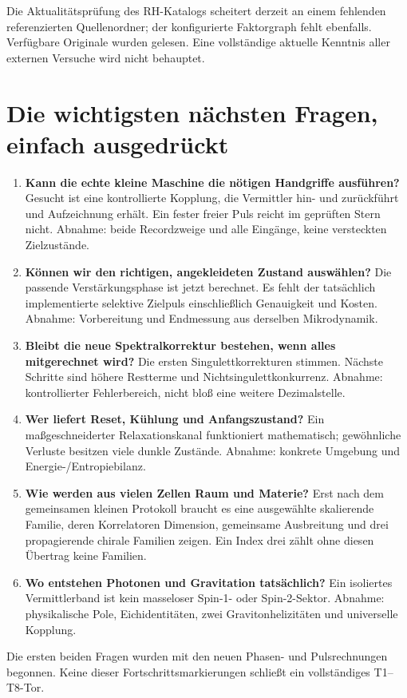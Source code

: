 Die Aktualitätsprüfung des RH-Katalogs scheitert derzeit an einem fehlenden referenzierten Quellenordner; der konfigurierte Faktorgraph fehlt ebenfalls. Verfügbare Originale wurden gelesen. Eine vollständige aktuelle Kenntnis aller externen Versuche wird nicht behauptet.

\section{Die wichtigsten nächsten Fragen, einfach ausgedrückt}
\begin{enumerate}
\item \textbf{Kann die echte kleine Maschine die nötigen Handgriffe ausführen?}
Gesucht ist eine kontrollierte Kopplung, die Vermittler hin- und zurückführt und Aufzeichnung erhält. Ein fester freier Puls reicht im geprüften Stern nicht. Abnahme: beide Recordzweige und alle Eingänge, keine versteckten Zielzustände.
\item \textbf{Können wir den richtigen, angekleideten Zustand auswählen?}
Die passende Verstärkungsphase ist jetzt berechnet. Es fehlt der tatsächlich implementierte selektive Zielpuls einschließlich Genauigkeit und Kosten. Abnahme: Vorbereitung und Endmessung aus derselben Mikrodynamik.
\item \textbf{Bleibt die neue Spektralkorrektur bestehen, wenn alles mitgerechnet wird?}
Die ersten Singulettkorrekturen stimmen. Nächste Schritte sind höhere Restterme und Nichtsingulettkonkurrenz. Abnahme: kontrollierter Fehlerbereich, nicht bloß eine weitere Dezimalstelle.
\item \textbf{Wer liefert Reset, Kühlung und Anfangszustand?}
Ein maßgeschneiderter Relaxationskanal funktioniert mathematisch; gewöhnliche Verluste besitzen viele dunkle Zustände. Abnahme: konkrete Umgebung und Energie-/Entropiebilanz.
\item \textbf{Wie werden aus vielen Zellen Raum und Materie?}
Erst nach dem gemeinsamen kleinen Protokoll braucht es eine ausgewählte skalierende Familie, deren Korrelatoren Dimension, gemeinsame Ausbreitung und drei propagierende chirale Familien zeigen. Ein Index drei zählt ohne diesen Übertrag keine Familien.
\item \textbf{Wo entstehen Photonen und Gravitation tatsächlich?}
Ein isoliertes Vermittlerband ist kein masseloser Spin-1- oder Spin-2-Sektor. Abnahme: physikalische Pole, Eichidentitäten, zwei Gravitonhelizitäten und universelle Kopplung.
\end{enumerate}
Die ersten beiden Fragen wurden mit den neuen Phasen- und Pulsrechnungen begonnen. Keine dieser Fortschrittsmarkierungen schließt ein vollständiges T1--T8-Tor.
